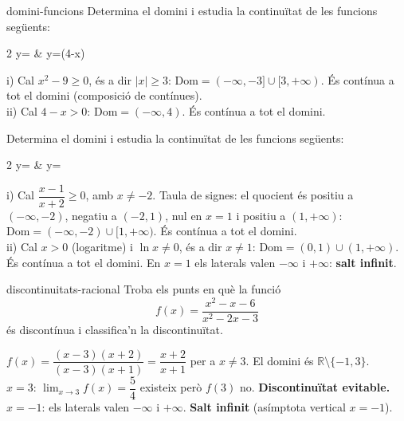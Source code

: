 \begin{apartats}

\begin{tria}{domini-funcions}
Determina el domini i estudia la continuïtat de les funcions següents:
\begin{graella}{2}
  \sa y= & \sa y=\ln(4-x)
\end{graella}

\begin{solucio}
i) Cal $x^2-9\ge0$, és a dir $|x|\ge3$: $\mathrm{Dom}=(-\infty,-3]\cup[3,+\infty)$.
És contínua a tot el domini (composició de contínues).\\
ii) Cal $4-x>0$: $\mathrm{Dom}=(-\infty,4)$. És contínua a tot el domini.
\end{solucio}

Determina el domini i estudia la continuïtat de les funcions següents:
\begin{graella}{2}
  \sa y= & \sa y=
\end{graella}

\begin{solucio}
i) Cal $\dfrac{x-1}{x+2}\ge0$, amb $x\ne-2$. Taula de signes: el quocient és positiu a
$(-\infty,-2)$, negatiu a $(-2,1)$, nul en $x=1$ i positiu a $(1,+\infty)$:
$\mathrm{Dom}=(-\infty,-2)\cup[1,+\infty)$. És contínua a tot el domini.\\
ii) Cal $x>0$ (logaritme) i $\ln x\ne0$, és a dir $x\ne1$: $\mathrm{Dom}=(0,1)\cup(1,+\infty)$.
És contínua a tot el domini. En $x=1$ els laterals valen $-\infty$ i $+\infty$:
\textbf{salt infinit}.
\end{solucio}
\end{tria}

\begin{tria}{discontinuitats-racional}
Troba els punts en què la funció
\[
f(x)=\frac{x^2-x-6}{x^2-2x-3}
\]
és discontínua i classifica'n la discontinuïtat.

\begin{solucio}
$f(x)=\dfrac{(x-3)(x+2)}{(x-3)(x+1)}=\dfrac{x+2}{x+1}$ per a $x\ne3$.
El domini és $\mathbb{R}\setminus\{-1,3\}$.\\
$x=3$: $\lim_{x\to3}f(x)=\dfrac54$ existeix però $f(3)$ no. \textbf{Discontinuïtat evitable.}\\
$x=-1$: els laterals valen $-\infty$ i $+\infty$. \textbf{Salt infinit} (asímptota vertical $x=-1$).
\end{solucio}


\end{tria}
\end{apartats}
